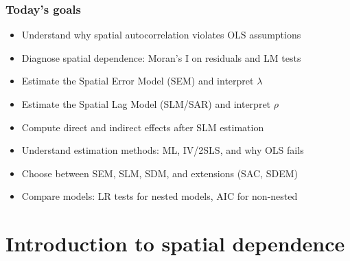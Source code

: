 \begin{frame}
  \titlepage
\end{frame}
\note{}

\begin{frame}
\frametitle{Today's goals}
\centering

\begin{itemize}
\item Understand why spatial autocorrelation violates OLS assumptions
\item Diagnose spatial dependence: Moran's I on residuals and LM tests
\item Estimate the Spatial Error Model (SEM) and interpret $\lambda$
\item Estimate the Spatial Lag Model (SLM/SAR) and interpret $\rho$
\item Compute direct and indirect effects after SLM estimation
\item Understand estimation methods: ML, IV/2SLS, and why OLS fails
\item Choose between SEM, SLM, SDM, and extensions (SAC, SDEM)
\item Compare models: LR tests for nested models, AIC for non-nested
\end{itemize}

\end{frame}

\section{Introduction to spatial dependence}

